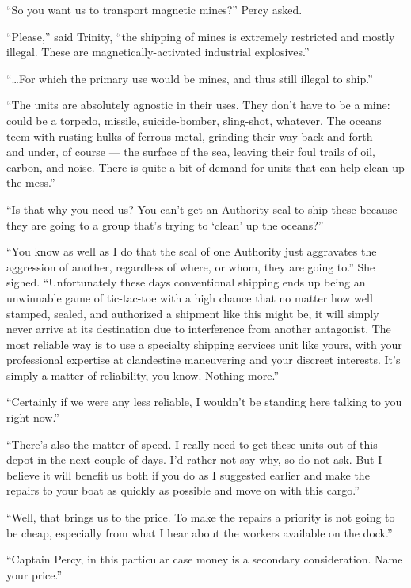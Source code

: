 \documentclass[]{scrbook}
\begin{document}
``So you want us to transport magnetic mines?'' Percy asked.

``Please,'' said Trinity, ``the shipping of mines is extremely
restricted and mostly illegal. These are magnetically-activated
industrial explosives.''

``\ldots{}For which the primary use would be mines, and thus still
illegal to ship.''

``The units are absolutely agnostic in their uses. They don't have to be
a mine: could be a torpedo, missile, suicide-bomber, sling-shot,
whatever. The oceans teem with rusting hulks of ferrous metal, grinding
their way back and forth --- and under, of course --- the surface of the
sea, leaving their foul trails of oil, carbon, and noise. There is quite
a bit of demand for units that can help clean up the mess.''

``Is that why you need us? You can't get an Authority seal to ship these
because they are going to a group that's trying to `clean' up the
oceans?''

``You know as well as I do that the seal of one Authority just
aggravates the aggression of another, regardless of where, or whom, they
are going to.'' She sighed. ``Unfortunately these days conventional
shipping ends up being an unwinnable game of tic-tac-toe with a high
chance that no matter how well stamped, sealed, and authorized a
shipment like this might be, it will simply never arrive at its
destination due to interference from another antagonist. The most
reliable way is to use a specialty shipping services unit like yours,
with your professional expertise at clandestine maneuvering and your
discreet interests. It's simply a matter of reliability, you know.
Nothing more.''

``Certainly if we were any less reliable, I wouldn't be standing here
talking to you right now.''

``There's also the matter of speed. I really need to get these units out
of this depot in the next couple of days. I'd rather not say why, so do
not ask. But I believe it will benefit us both if you do as I suggested
earlier and make the repairs to your boat as quickly as possible and
move on with this cargo.''

``Well, that brings us to the price. To make the repairs a priority is
not going to be cheap, especially from what I hear about the workers
available on the dock.''

``Captain Percy, in this particular case money is a secondary
consideration. Name your price.''
\end{document}
